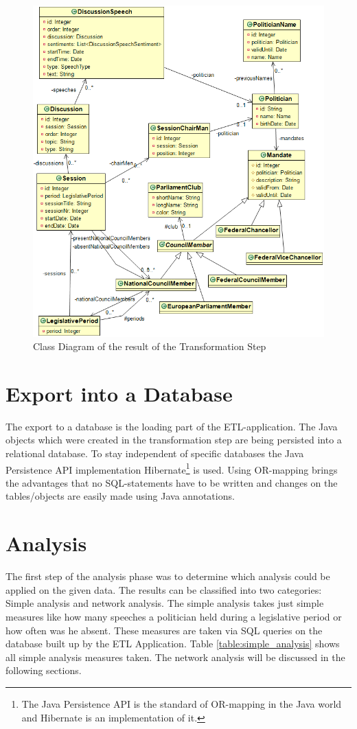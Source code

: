 \begin{figure}[h]
	\centering
	\includegraphics[width=\textwidth]{imgs/all_class_diagram}
	\caption{Class Diagram of the result of the Transformation Step}
	\label{fig:all_class_diagram}
\end{figure}


\section{Export into a Database}
\label{sec:export_db}
The export to a database is the loading part of the ETL-application. The Java objects which were created in the transformation step are being persisted into a relational database. To stay independent of specific databases the Java Persistence API implementation Hibernate\footnote{The Java Persistence API is the standard of OR-mapping in the Java world and Hibernate is an implementation of it.} is used. Using OR-mapping brings the advantages that no SQL-statements have to be written and changes on the tables/objects are easily made using Java annotations.

\section{Analysis}
\label{sec:analysis}
The first step of the analysis phase was to determine which analysis could be applied on the given data. The results can be classified into two categories: Simple analysis and network analysis. The simple analysis takes just simple measures like how many speeches a politician held during a legislative period or how often was he absent. These measures are taken via SQL queries on the database built up by the ETL Application. Table \ref{table:simple_analysis} shows all simple analysis measures taken. The network analysis will be discussed in the following sections.

